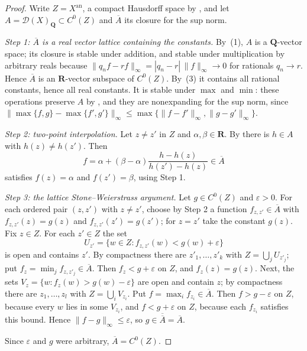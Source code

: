 \begin{proof}
Write $Z=X^{\mathrm{an}}$, a compact Hausdorff space by
, and let
$A=\mathcal D(X)_{\mathbf Q}\subset C^0(Z)$ and
$\overline A$ its closure for the sup norm.

\emph{Step 1: $\overline A$ is a real vector lattice containing the
constants.} By \,(1), $A$ is a
$\mathbf Q$-vector space; its closure is stable under addition, and stable
under multiplication by arbitrary reals because
$\|q_nf-rf\|_\infty=|q_n-r|\,\|f\|_\infty\to0$ for rationals
$q_n\to r$. Hence $\overline A$ is an $\mathbf R$-vector subspace of
$C^0(Z)$. By \,(3) it contains
all rational constants, hence all real constants. It is stable under
$\max$ and $\min$: these operations preserve $A$ by
, and they are nonexpanding for the sup
norm, since
$\|\max\{f,g\}-\max\{f',g'\}\|_\infty\le
\max\{\|f-f'\|_\infty,\|g-g'\|_\infty\}$.

\emph{Step 2: two-point interpolation.} Let $z\ne z'$ in $Z$ and
$\alpha,\beta\in\mathbf R$. By  there
is $h\in A$ with $h(z)\ne h(z')$. Then
\[
 f=\alpha+(\beta-\alpha)\frac{h-h(z)}{h(z')-h(z)}\in\overline A
\]
satisfies $f(z)=\alpha$ and $f(z')=\beta$, using Step 1.

\emph{Step 3: the lattice Stone--Weierstrass argument.} Let
$g\in C^0(Z)$ and $\varepsilon>0$. For each ordered pair
$(z,z')$ with $z\ne z'$, choose by Step 2 a function
$f_{z,z'}\in\overline A$ with $f_{z,z'}(z)=g(z)$ and
$f_{z,z'}(z')=g(z')$; for $z=z'$ take the constant $g(z)$. Fix
$z\in Z$. For each $z'\in Z$ the set
\[
 U_{z'}=\{w\in Z: f_{z,z'}(w)<g(w)+\varepsilon\}
\]
is open and contains $z'$. By compactness there are
$z'_1,\ldots,z'_k$ with $Z=\bigcup_jU_{z'_j}$; put
$f_z=\min_jf_{z,z'_j}\in\overline A$. Then $f_z<g+\varepsilon$ on
$Z$, and $f_z(z)=g(z)$. Next, the sets
$V_z=\{w:f_z(w)>g(w)-\varepsilon\}$ are open and contain $z$; by
compactness there are $z_1,\ldots,z_l$ with $Z=\bigcup_iV_{z_i}$. Put
$f=\max_if_{z_i}\in\overline A$. Then $f>g-\varepsilon$ on $Z$,
because every $w$ lies in some $V_{z_i}$, and $f<g+\varepsilon$ on
$Z$, because each $f_{z_i}$ satisfies this bound. Hence
$\|f-g\|_\infty\le\varepsilon$, so $g\in\overline{\overline A}=\overline
A$.

Since $\varepsilon$ and $g$ were arbitrary,
$\overline A=C^0(Z)$.
\end{proof}

